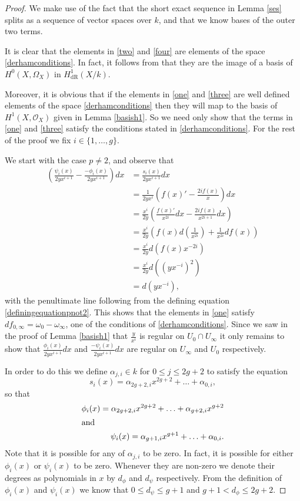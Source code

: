\documentclass[draft, 11pt]{article} %
\theoremstyle{plain}
\theoremstyle{remark}
\newcommand{\hone}{H^1(X,\mathcal{O}_X)}
\newcommand{\derhamhone}{H_{\text {dR}}^1(X/k)}
\begin{document}
\begin{proof}
We make use of the fact that the short exact sequence in Lemma \ref{ses} splits as a sequence of vector spaces over $k$, and that we know bases of the outer two terms.

It is clear that the elements in \eqref{two} and \eqref{four} are elements of the space \eqref{derhamconditions}. 
In fact, it follows from \cite[Thm 6.1]{faithfulaction} that they are the image of a basis of $H^0(X,\Omega_X)$ in $\derhamhone$.

Moreover, it is obvious that if the elements in \eqref{one} and \eqref{three} are well defined elements of the space \eqref{derhamconditions} then they will map to the basis of $\hone$ given in Lemma \ref{basish1}.
So we need only show that the terms in \eqref{one} and \eqref{three} satisfy the conditions stated in \eqref{derhamconditions}.
For the rest of the proof we fix $i \in \{1, \ldots ,g\}$.


We start with the case $p\neq 2$, and observe that
\begin{align*}
\left(  \frac{\psi_i(x)}{2yx^{i+1}}  - \frac{-\phi_i(x)}{2yx^{i+1}} \right) dx & =  \frac{s_i(x)}{2yx^{i+1}} dx \\
& =  \frac{1}{2yx^i} \left( f(x)' - \frac{2if(x)}{x} \right) dx \\
& =  \frac{x^i}{2y} \left( \frac{f(x)'}{x^{2i}}dx -\frac{2if(x)}{x^{2i+1}} dx \right) \\
& =  \frac{x^i}{2y} \left( f(x)d\left(\frac{1}{x^{2i}}\right) + \frac{1}{x^{2i}}df(x) \right) \\
& =  \frac{x^i}{2y}d(f(x)x^{-2i}) \\
& =  \frac{x^i}{2y} d\left(\left(yx^{-i}\right)^2\right) \\
& =  d(yx^{-i}),
\end{align*}
with the penultimate line following from the defining equation \eqref{definingequationpnot2}.
This shows that the elements in \eqref{one} satisfy $df_{0, \infty} = \omega_0 - \omega_\infty$, one of the conditions of \eqref{derhamconditions}.
Since we saw in the proof of Lemma \ref{basish1} that $\frac{y}{x^i}$ is regular on $U_0\cap U_\infty$ it only remains to show that $\frac{\phi_i(x)}{2yx^{i+1}}dx$ and $\frac{-\psi_i(x)}{2yx^{i+1}}dx$ are regular on $U_\infty$ and $U_0$ respectively.


In order to do this we define $\alpha_{j,i} \in k$ for $0\leq j \leq 2g+2$ to satisfy the equation
\[
s_i(x) = \alpha_{2g+2,i}x^{2g+2} + \ldots + \alpha_{0,i},
\]
so that
\begin{align*}
\phi_i(x) = \alpha_{2g+2,i}x^{2g+2} + \ldots + \alpha_{g+2,i}x^{g+2} \\
\intertext{and }
\psi_i(x) = \alpha_{g+1,i}x^{g+1} + \ldots + \alpha_{0,i}.
\end{align*}
Note that it is possible for any of $\alpha_{j,i}$ to be zero. In fact, it is possible for either $\phi_i(x)$ or $\psi_i(x)$ to be zero.
Whenever they are non-zero we denote their degrees as polynomials in $x$ by $d_\phi$ and $d_\psi$ respectively. From the definition of $\phi_i(x)$ and $\psi_i(x)$ we know that $0 \leq d_\psi \leq g+1$ and $g+1 < d_\phi \leq 2g+2$.



\end{proof}
\end{document}
